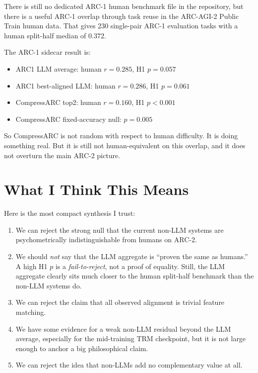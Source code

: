 \documentclass[11pt,letterpaper]{article}
\begin{document}
There is still no dedicated ARC-1 human benchmark file in the repository, but there is a useful ARC-1 overlap through task reuse in the ARC-AGI-2 Public Train human data. That gives 230 single-pair ARC-1 evaluation tasks with a human split-half median of $0.372$.

The ARC-1 sidecar result is:

\begin{itemize}
    \item ARC1 LLM average: human $r = 0.285$, H1 $p = 0.057$
    \item ARC1 best-aligned LLM: human $r = 0.286$, H1 $p = 0.061$
    \item CompressARC top2: human $r = 0.160$, H1 $p < 0.001$
    \item CompressARC fixed-accuracy null: $p = 0.005$
\end{itemize}

So CompressARC is not random with respect to human difficulty. It is doing something real. But it is still not human-equivalent on this overlap, and it does not overturn the main ARC-2 picture.

\section{What I Think This Means}

Here is the most compact synthesis I trust:

\begin{enumerate}
    \item We can reject the strong null that the current non-LLM systems are psychometrically indistinguishable from humans on ARC-2.
    \item We should \emph{not} say that the LLM aggregate is ``proven the same as humans.'' A high H1 $p$ is a \emph{fail-to-reject}, not a proof of equality. Still, the LLM aggregate clearly sits much closer to the human split-half benchmark than the non-LLM systems do.
    \item We can reject the claim that all observed alignment is trivial feature matching.
    \item We have some evidence for a weak non-LLM residual beyond the LLM average, especially for the mid-training TRM checkpoint, but it is not large enough to anchor a big philosophical claim.
    \item We can reject the idea that non-LLMs add no complementary value at all.
\end{enumerate}
\end{document}
